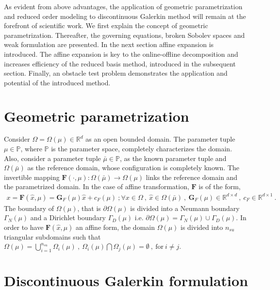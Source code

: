 \documentclass[graybox]{svmult}
\begin{document}
As evident from above advantages, the application of geometric parametrization and reduced order modeling to discontinuous Galerkin method will remain at the forefront of scientific work. We first explain the concept of geometric parametrization. Thereafter, the governing equations, broken Sobolev spaces and weak formulation are presented. In the next section affine expansion is introduced. The affine expansion is key to the online-offline decomposition and increases efficiency of the reduced basis method, introduced in the subsequent section. Finally, an obstacle test problem demonstrates the application and potential of the introduced method.

\section{Geometric parametrization}\label{geometric_parametrization_section}

Consider $\Omega = \Omega(\mu) \in \mathbb{R}^d$ as an open bounded domain. The parameter tuple $\mu \in \mathbb{P}$, where $\mathbb{P}$ is the parameter space, completely characterizes the domain. Also, consider a parameter tuple $\bar{\mu} \in \mathbb{P}$, as the known parameter tuple and $\Omega(\bar{\mu})$ as the reference domain, whose configuration is completely known. The invertible mapping $\bm{F}(\cdot,\mu) : \Omega(\bar{\mu}) \rightarrow \Omega(\mu)$ links the reference domain and the parametrized domain. In the case of affine transformation, $\bm{F}$ is of the form,
\begin{equation*}\label{affine_F}
\begin{split}
x = \bm{F}(\hat{x},\mu) = \bm{G}_F(\mu)\hat{x} + c_F(\mu) \ ; \forall x \in \Omega \ , \ \hat{x} \in \Omega(\bar{\mu}) \ , \ \bm{G}_F(\mu) \in \mathbb{R}^{d \times d} \ , \ c_F \in \mathbb{R}^{d \times 1} \ .
\end{split}
\end{equation*}
The boundary of $\Omega(\mu)$, that is $\partial \Omega(\mu)$ is divided into a  Neumann boundary $\Gamma_N(\mu)$ and a Dirichlet boundary $\Gamma_D(\mu)$ i.e. $\partial \Omega(\mu) = \Gamma_N(\mu) \cup \Gamma_D(\mu)$. In order to have $\bm{F}(\hat{x},\mu)$ an affine form, the domain $\Omega(\mu)$ is divided into $n_{su}$ triangular subdomains such that $\Omega(\mu) = \bigcup\limits_{i=1}^{n_{su}} \Omega_i(\mu) \ , \ \Omega_i(\mu) \bigcap \Omega_j(\mu) = \emptyset \ , \ \text{for} \ i \neq j$.

\section{Discontinuous Galerkin formulation}
\label{DG_formulation}
\end{document}
